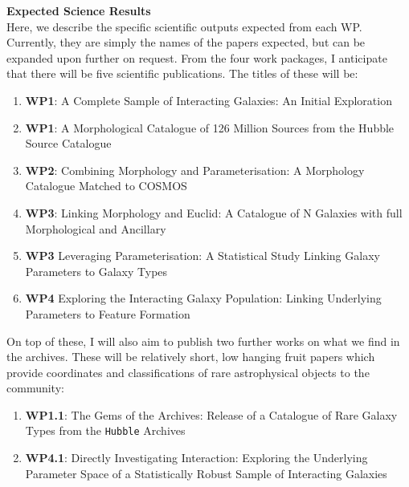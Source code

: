 \documentclass[11pt,usenatbib]{article}
\begin{document}

\noindent\textbf{Expected Science Results} \\
\noindent Here, we describe the specific scientific outputs expected from each WP. Currently, they are simply the names of the papers expected, but can be expanded upon further on request. From the four work packages, I anticipate that there will be five scientific publications. The titles of these will be:

\begin{enumerate}[itemsep=0pt, parsep=0pt, topsep=0pt]
    \item \textbf{WP1}: A Complete Sample of Interacting Galaxies: An Initial Exploration
    \item \textbf{WP1}: A Morphological Catalogue of 126 Million Sources from the Hubble Source Catalogue
    \item \textbf{WP2}: Combining Morphology and Parameterisation: A Morphology Catalogue Matched to COSMOS
    \item \textbf{WP3}: Linking Morphology and Euclid: A Catalogue of N Galaxies with full Morphological and Ancillary
    \item \textbf{WP3} Leveraging Parameterisation: A Statistical Study Linking Galaxy Parameters to Galaxy Types
    \item \textbf{WP4} Exploring the Interacting Galaxy Population: Linking Underlying Parameters to Feature Formation
\end{enumerate}

\noindent On top of these, I will also aim to publish two further works on what we find in the archives. These will be relatively short, low hanging fruit papers which provide coordinates and classifications of rare astrophysical objects to the community:
\begin{enumerate}[itemsep=0pt, parsep=0pt, topsep=0pt]
    \item \textbf{WP1.1}: The Gems of the Archives: Release of a Catalogue of Rare Galaxy Types from the \texttt{Hubble} Archives
    \item \textbf{WP4.1}: Directly Investigating Interaction: Exploring the Underlying Parameter Space of a Statistically Robust Sample of Interacting Galaxies
\end{enumerate}




\end{document}
